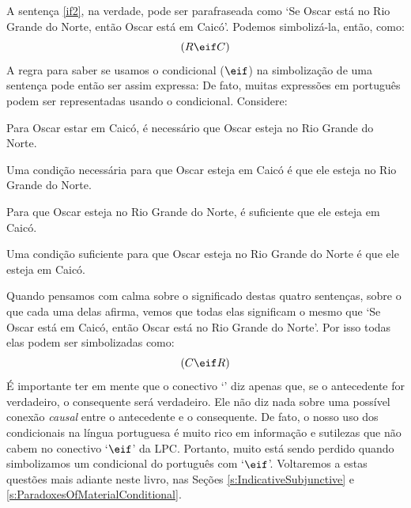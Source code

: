 A sentença \ref{if2}, na verdade, pode ser parafraseada como `Se Oscar está no Rio Grande do Norte, então Oscar está em Caicó'.
Podemos simbolizá-la, então, como:
$$(R \eif C)$$
A regra para saber se usamos o condicional ($\eif$) na simbolização de uma sentença pode então ser assim expressa:
\noindent De fato, muitas expressões em português podem ser representadas usando o condicional. Considere:
	\begin{earg}
		\item[\ex{ifnec1}] Para Oscar estar em Caicó, é necessário que Oscar esteja no Rio Grande do Norte.
		\item[\ex{ifnec2}] Uma condição necessária para que Oscar esteja em Caicó é que ele esteja no Rio Grande do Norte.
		\item[\ex{ifsuf1}] Para que Oscar esteja no Rio Grande do Norte, é suficiente que ele esteja em Caicó.
		\item[\ex{ifsuf2}] Uma condição suficiente para que Oscar esteja no Rio Grande do Norte é que ele esteja em Caicó.
	\end{earg}
Quando pensamos com calma sobre o significado destas quatro sentenças, sobre o que cada uma delas afirma, vemos que todas elas significam o mesmo que `Se Oscar está em Caicó, então Oscar está no Rio Grande do Norte'.
Por isso todas elas podem ser simbolizadas como:
$$(C \eif R)$$
É importante ter em mente que o conectivo `\eif' diz apenas que, se o antecedente for verdadeiro, o consequente será verdadeiro.
Ele não diz nada sobre uma possível conexão \emph{causal} entre o antecedente e o consequente.
De fato, o nosso uso dos condicionais na língua portuguesa é muito rico em informação e sutilezas que não cabem no conectivo `$\eif$' da LPC.
Portanto, muito está sendo perdido quando simbolizamos um condicional do português com `$\eif$'.
Voltaremos a estas questões mais adiante neste livro, nas Seções \ref{s:IndicativeSubjunctive} e \ref{s:ParadoxesOfMaterialConditional}.


